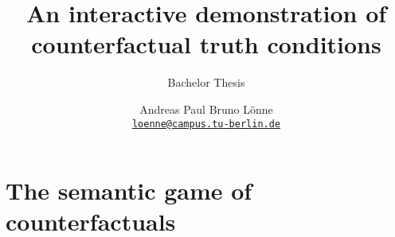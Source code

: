 \documentclass[a4paper,american]{paper}
\providecommand*{\code}[1]{\texttt{#1}}
\theoremstyle{definition}\newtheorem{definition}{Definition}
\begin{document}
\title{An interactive demonstration of counterfactual truth conditions}

\subtitle{Bachelor Thesis}

\author{%
	Andreas Paul Bruno Lönne\\
	\code{\href{mailto:loenne@campus.tu-berlin.de}{loenne@campus.tu-berlin.de}}
}


\maketitle

\section{The semantic game of counterfactuals}
\end{document}
